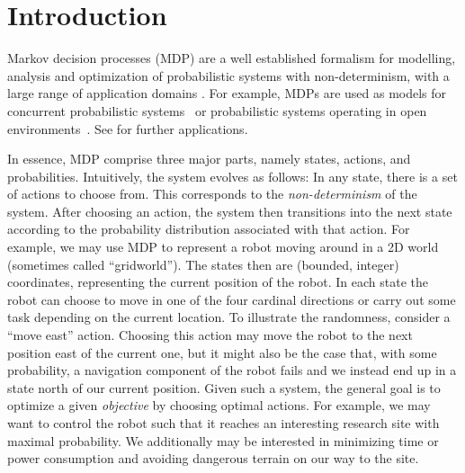 \documentclass{article}
\begin{document}
	\section{Introduction} \label{sec:introduction}


Markov decision processes (MDP) \cite{howard1960dynamic,filar1996competitive,DBLP:books/wi/Puterman94} are a well established formalism for modelling, analysis and optimization of probabilistic systems with non-determinism, with a large range of application domains \cite{DBLP:books/daglib/0020348,DBLP:conf/cav/KwiatkowskaNP11}.
For example, MDPs are used as models for concurrent probabilistic systems~\cite{DBLP:journals/jacm/CourcoubetisY95} or probabilistic systems operating in open environments~\cite{segala1996modeling}.
See \cite{white1985real,white1988further,white1993survey} for further applications.

In essence, MDP comprise three major parts, namely states, actions, and probabilities.
Intuitively, the system evolves as follows:
In any state, there is a set of actions to choose from.
This corresponds to the \emph{non-determinism} of the system.
After choosing an action, the system then transitions into the next state according to the probability distribution associated with that action.
For example, we may use MDP to represent a robot moving around in a 2D world (sometimes called \enquote{gridworld}).
The states then are (bounded, integer) coordinates, representing the current position of the robot.
In each state the robot can choose to move in one of the four cardinal directions or carry out some task depending on the current location.
To illustrate the randomness, consider a \enquote{move east} action.
Choosing this action may move the robot to the next position east of the current one, but it might also be the case that, with some probability, a navigation component of the robot fails and we instead end up in a state north of our current position.
Given such a system, the general goal is to optimize a given \emph{objective} by choosing optimal actions.
For example, we may want to control the robot such that it reaches an interesting research site with maximal probability.
We additionally may be interested in minimizing time or power consumption and avoiding dangerous terrain on our way to the site.
\end{document}
